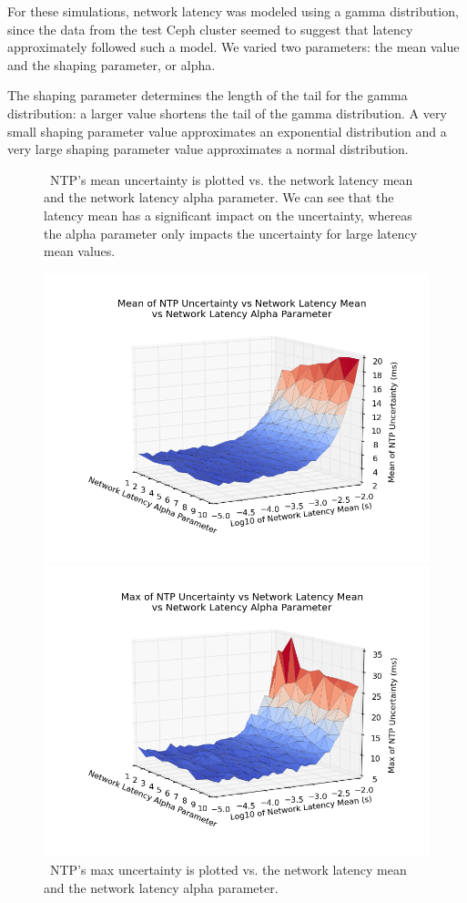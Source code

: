 For these simulations, network latency was modeled using a gamma
distribution,
since the data from the test Ceph cluster seemed to suggest that
latency approximately followed such a model. We varied two parameters:
the mean value and the shaping parameter, or alpha.

The shaping parameter determines the length of the tail for the gamma
distribution: a larger value shortens the tail of the gamma
distribution.  A very small shaping parameter value approximates an
exponential distribution and a very large shaping parameter value
approximates a normal distribution.


\begin{figure}[!htbp]
  \caption{~NTP's mean uncertainty is plotted vs. the network latency mean and the network latency alpha parameter. We can see that the latency mean has a significant impact on the uncertainty, whereas the alpha parameter only impacts the uncertainty for large latency mean values.}
  \label{fig:mean-uncertainty_latency-mean_latency-alpha}
  \includegraphics[width=0.8\linewidth]{mean_max_error-mean_latency-latency_alpha.png}

  \caption{~NTP's max uncertainty is plotted vs. the network latency mean and the network latency alpha parameter.}
  \label{fig:max-uncertainty_latency-mean_latency-alpha}
  \includegraphics[width=0.8\linewidth]{max_error-latency_mean-latency_alpha.png}
\end{figure}
